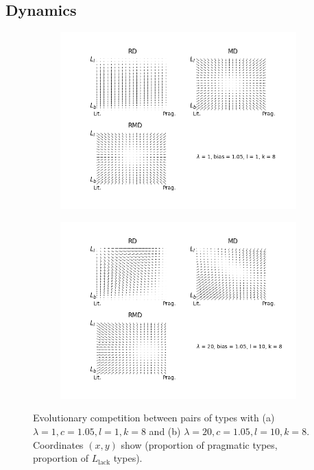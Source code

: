 \documentclass[fleqn,reqno,10pt]{article}
\newcommand{\mylang}[1]{\ensuremath{L_{\text{#1}}}\xspace} %
\newcommand{\Llack}{\mylang{lack}}
\begin{document}
\subsection*{Dynamics}
\begin{figure}
\centering
\begin{subfigure}{.6\textwidth}
  \centering
  \includegraphics[scale=0.4]{quiver-lam1-c105-k8-l1}
  \caption{}
  \label{fig:sub1}
\end{subfigure}%
\begin{subfigure}{.6\textwidth}
  \centering
  \includegraphics[scale=0.4]{quiver-lam20-c105-k8-l10}
  \caption{}
  \label{fig:sub2}
\end{subfigure}
\caption{Evolutionary competition between pairs of types with (a) $\lambda = 1, c = 1.05, l = 1, k = 8$ and (b) $\lambda = 20, c = 1.05, l =10, k =8$. Coordinates $(x,y)$ show (proportion of pragmatic types, proportion of $\Llack$ types).}
\label{fig:quivera}
\end{figure}
\end{document}
